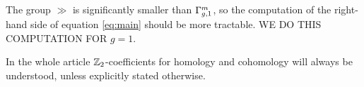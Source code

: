 The group $\gg$ is significantly smaller than $\Gamma_{g,1}^m$, so the
computation of the right-hand side of equation \ref{eq:main}
should be more tractable.
WE DO THIS COMPUTATION FOR $g=1$.

In the whole article $\mathbb{Z}_2$-coefficients for homology and cohomology will always be understood,
unless explicitly stated otherwise.
